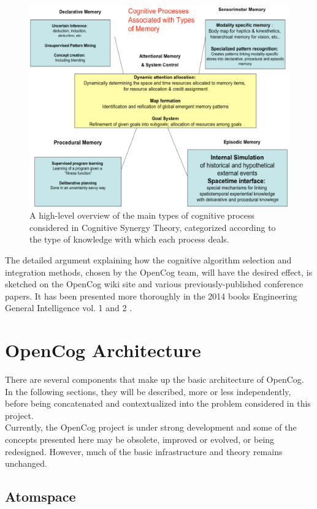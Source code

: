 \begin{figure} [h]
\centering
\includegraphics[width=0.7
\textwidth]{figures/Magistrale/04 - cognitive_processes_and_memory}
\caption[Cognitive Processes.]{A high-level overview of the main types of cognitive process considered in Cognitive Synergy Theory, categorized according to the type of knowledge with which each process deals.
\label{fig:cognitive_processes}}
\end{figure} 

The detailed argument explaining how the cognitive algorithm selection and integration methods, chosen by the OpenCog team, will have the desired effect, is sketched on the OpenCog wiki site\footnotemark{} and various previously-published conference papers. It has been presented more thoroughly in the 2014 books Engineering General Intelligence vol. 1 and 2 \cite{DBLP:series/atlantis/GoertzelPG14, DBLP:series/atlantis/GoertzelPG14a}.

\section{OpenCog Architecture}\label{sec:opencog_architecture}

There are several components that make up the basic architecture of OpenCog. In the following sections, they will be described, more or less independently, before being concatenated and contextualized into the problem considered in this project. \\
Currently, the OpenCog project is under strong development and some of the concepts presented here may be obsolete, improved or evolved, or being redesigned. However, much of the basic infrastructure and theory remains unchanged.  

\subsection{Atomspace}\label{sec:atomspace}

